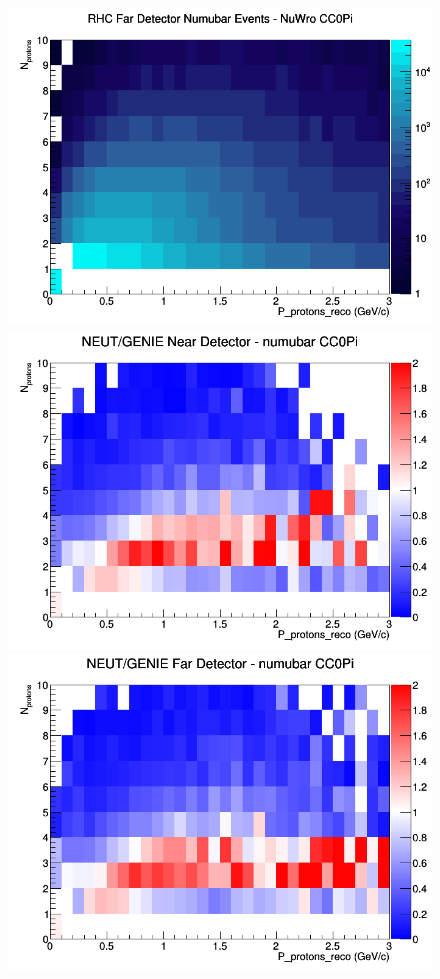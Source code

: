 \documentclass[12pt]{article}
\begin{document}
\begin{figure}[h]
\endminipage
{}
\includegraphics[width=\linewidth]{eff_N_P/LAr/protons/CC0Pi_RHC_FD_numubar_N_P_NuWro.png}
\endminipage
\newline
{}
\includegraphics[width=\linewidth]{eff_N_P/LAr/protons/ratios/CC0Pi_NEUT_GENIE_numubar_near_N_P.png}
\endminipage
{}
\includegraphics[width=\linewidth]{eff_N_P/LAr/protons/ratios/CC0Pi_NEUT_GENIE_numubar_far_N_P.png}

\end{figure}
\end{document}
